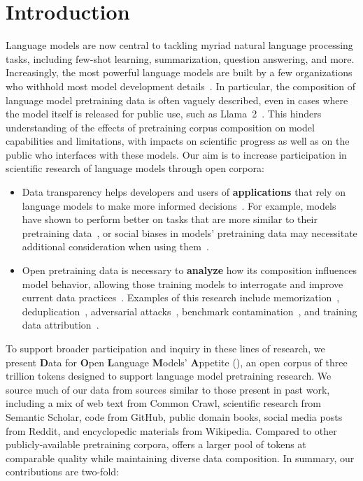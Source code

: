 


\section{Introduction}

Language models are now central to tackling myriad natural language processing tasks, including few-shot learning, summarization, question answering, and more.
Increasingly, the most powerful language models are built by a few organizations who withhold most model development details~\citep{claude-announce,OpenAI2023GPT4TR,Anil2023PaLM2T,Gemini-Team2023-gn}. 
In particular, the composition of language model pretraining data is often vaguely described, even in cases where the model itself is released for public use, such as Llama~2~\citep{Touvron2023Llama2O}.  
This hinders understanding of the effects of pretraining corpus composition on model capabilities and limitations, with impacts on scientific progress as well as on the public who interfaces with these models. 
Our aim is to increase participation in scientific research of language models through open corpora:
\begin{itemize}[leftmargin=1em]
    \item  Data transparency helps developers and users of \textbf{applications} that rely on language models to make more informed decisions~\citep{gebru2021datasheets}.  
    For example, models have shown to perform better on tasks that are more similar to their pretraining data~\citep{razeghi-etal-2022-impact,pmlr-v202-kandpal23a},
    or social biases in models' pretraining data may necessitate additional consideration when using them~\citep{feng-etal-2023-pretraining,Navigli2023Biases,seshadri2023bias}.
    \item Open pretraining data is necessary to \textbf{analyze} 
    how its composition influences model behavior, allowing those training models to interrogate and improve current data practices~\citep{Longpre2023APG,Gao2021EmpircalEQ,wimbd}. 
    Examples of this research include memorization~\citep{Carlini2022-mj,Chang2023SpeakMA}, deduplication~\citep{lee-etal-2022-deduplicating}, adversarial attacks~\citep{wallace-etal-2021-concealed}, benchmark contamination~\citep{magar-schwartz-2022-data}, and training data attribution~\citep{Hammoudeh2022TrainingDI,Grosse2023StudyingLL}.
\end{itemize}


To support broader participation and inquiry in these lines of research, we present \textbf{D}ata for \textbf{O}pen \textbf{L}anguage \textbf{M}odels' \textbf{A}ppetite (\dolma), an open corpus of three trillion tokens designed to support language model pretraining research. 
We source much of our data from sources similar to those present in past work, including a mix of web text from Common Crawl, scientific research from Semantic Scholar, code from GitHub, public domain books, social media posts from Reddit, and encyclopedic materials from Wikipedia.
Compared to other publicly-available pretraining corpora, \dolma offers a larger pool of tokens at comparable quality while maintaining diverse data composition. 
In summary, our contributions are two-fold:

